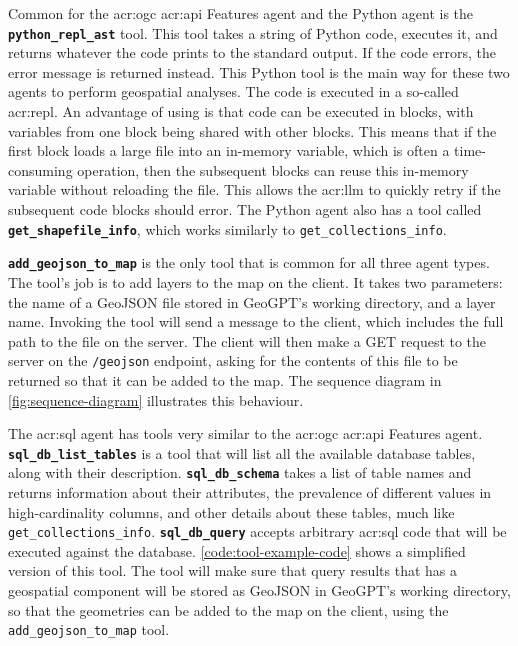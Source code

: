 Common for the \acrshort{acr:ogc} \acrshort{acr:api} Features agent and the Python agent is the \textbf{\texttt{python\_repl\_ast}} tool. This tool takes a string of Python code, executes it, and returns whatever the code prints to the standard output. If the code errors, the error message is returned instead. This Python tool is the main way for these two agents to perform geospatial analyses. The code is executed in a so-called \acrfull{acr:repl}. An advantage of using  is that code can be executed in blocks, with variables from one block being shared with other blocks. This means that if the first block loads a large file into an in-memory variable, which is often a time-consuming operation, then the subsequent blocks can reuse this in-memory variable without reloading the file. This allows the \acrshort{acr:llm} to quickly retry if the subsequent code blocks should error. The Python agent also has a tool called \textbf{\texttt{get\_shapefile\_info}}, which works similarly to \texttt{get\_collections\_info}.

\textbf{\texttt{add\_geojson\_to\_map}} is the only tool that is common for all three agent types. The tool's job is to add layers to the map on the client. It takes two parameters: the name of a GeoJSON file stored in GeoGPT's working directory, and a layer name. Invoking the tool will send a message to the client, which includes the full path to the file on the server. The client will then make a GET request to the server on the \texttt{/geojson} endpoint, asking for the contents of this file to be returned so that it can be added to the map. The sequence diagram in \autoref{fig:sequence-diagram} illustrates this behaviour.

The \acrshort{acr:sql} agent has tools very similar to the \acrshort{acr:ogc} \acrshort{acr:api} Features agent. \textbf{\texttt{sql\_db\_list\_tables}} is a tool that will list all the available database tables, along with their description. \textbf{\texttt{sql\_db\_schema}} takes a list of table names and returns information about their attributes, the prevalence of different values in high-cardinality columns, and other details about these tables, much like \texttt{get\_collections\_info}. \textbf{\texttt{sql\_db\_query}} accepts arbitrary \acrshort{acr:sql} code that will be executed against the database. \autoref{code:tool-example-code} shows a simplified version of this tool. The tool will make sure that query results that has a geospatial component will be stored as GeoJSON in GeoGPT's working directory, so that the geometries can be added to the map on the client, using the \texttt{add\_geojson\_to\_map} tool.


